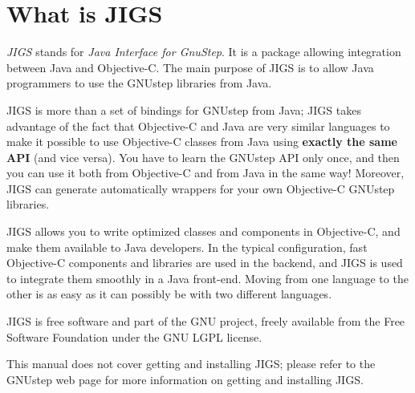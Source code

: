 \chapter{What is JIGS}

\emph{JIGS} stands for \emph{Java Interface for GnuStep}.  It is a package
allowing integration between Java and Objective-C.  The main purpose
of JIGS is to allow Java programmers to use the GNUstep libraries from
Java.

JIGS is more than a set of bindings for GNUstep from Java; JIGS takes
advantage of the fact that Objective-C and Java are very similar
languages to make it possible to use Objective-C classes from Java
using {\bf exactly the same API} (and vice versa).  You have to learn
the GNUstep API only once, and then you can use it both from
Objective-C and from Java in the same way!  Moreover, JIGS can
generate automatically wrappers for your own Objective-C GNUstep
libraries.

JIGS allows you to write optimized classes and components in
Objective-C, and make them available to Java developers.  In the
typical configuration, fast Objective-C components and libraries are
used in the backend, and JIGS is used to integrate them smoothly in a
Java front-end.  Moving from one language to the other is as easy as
it can possibly be with two different languages.

JIGS is free software and part of the GNU project, freely available
from the Free Software Foundation under the GNU LGPL license.

This manual does not cover getting and installing JIGS; please refer
to the GNUstep web page for more information on getting and installing
JIGS.


